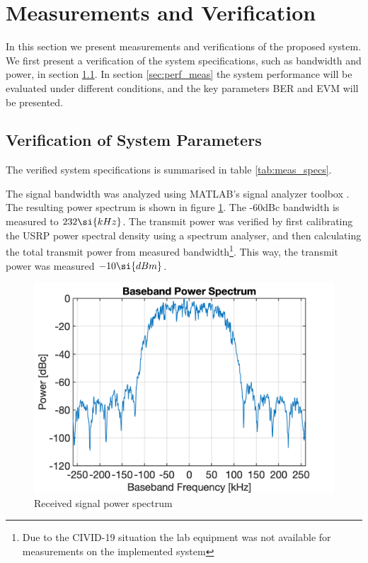 \section{Measurements and Verification}
\label{sec:verification}
In this section we present measurements and verifications of the proposed system. We first present a verification of the system specifications, such as bandwidth and power, in section \ref{sec:specs_verification}. In section \ref{sec:perf_meas} the system performance will be evaluated under different conditions, and the key parameters BER and EVM will be presented.

\subsection{Verification of System Parameters}
\label{sec:specs_verification}
The verified system specifications is summarised in table \ref{tab:meas_specs}.


The signal bandwidth was analyzed using MATLAB's signal analyzer toolbox \cite{signalAnalyzer}. The resulting power spectrum is shown in figure \ref{fig:pwr_spectrum}. The -60dBc bandwidth is measured to $\measBW \si{kHz}$.
The transmit power was verified by first calibrating the USRP power spectral density using a spectrum analyser, and then calculating the total transmit power from measured bandwidth\footnote{Due to the CIVID-19 situation the lab equipment was not available for measurements on the implemented system}. This way, the transmit power was measured $\measPWR \si{dBm}$.

\begin{figure}[htbp]
\begin{center}
\includegraphics[width=\figW\linewidth]{spectrum.png}
\caption{Received signal power spectrum}
\label{fig:pwr_spectrum}
\end{center}
\end{figure}


